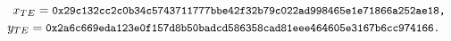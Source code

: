 $$x_{TE} = \text{{\small{\tt 0x29c132cc2c0b34c5743711777bbe42f32b79c022ad998465e1e71866a252ae18,}}}$$
$$y_{TE} = \text{{\small{\tt 0x2a6c669eda123e0f157d8b50badcd586358cad81eee464605e3167b6cc974166.
}}}$$
